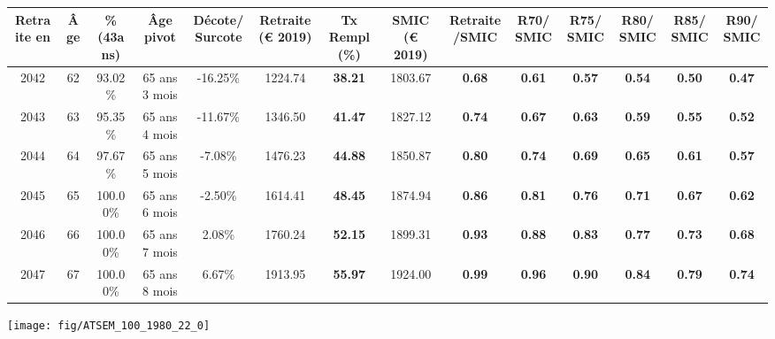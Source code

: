 \begin{adjustbox}{max width=\textwidth} 
\begin{tabular}[htb]{|c|c||c|c|c||c|c||c|c||c|c|c|c|c|} 
\hline 
 Retraite en &  Âge &  \%(43ans) &  Âge pivot &  Décote/Surcote &  Retraite (\euro{} 2019) &  Tx Rempl(\%) &  SMIC (\euro{} 2019) &  Retraite/SMIC &  R70/SMIC &  R75/SMIC &  R80/SMIC &  R85/SMIC &  R90/SMIC \\ 
\hline \hline 
 2042 &  62 &  93.02\% &  65 ans 3 mois &  -16.25\% &  1224.74 &  {\bf 38.21} &  1803.67 &  {\bf {\color{red} 0.68}} &  {\bf {\color{red} 0.61}} &  {\bf {\color{red} 0.57}} &  {\bf {\color{red} 0.54}} &  {\bf {\color{red} 0.50}} &  {\bf {\color{red} 0.47}} \\ 
\hline 
 2043 &  63 &  95.35\% &  65 ans 4 mois &  -11.67\% &  1346.50 &  {\bf 41.47} &  1827.12 &  {\bf {\color{red} 0.74}} &  {\bf {\color{red} 0.67}} &  {\bf {\color{red} 0.63}} &  {\bf {\color{red} 0.59}} &  {\bf {\color{red} 0.55}} &  {\bf {\color{red} 0.52}} \\ 
\hline 
 2044 &  64 &  97.67\% &  65 ans 5 mois &  -7.08\% &  1476.23 &  {\bf 44.88} &  1850.87 &  {\bf {\color{red} 0.80}} &  {\bf {\color{red} 0.74}} &  {\bf {\color{red} 0.69}} &  {\bf {\color{red} 0.65}} &  {\bf {\color{red} 0.61}} &  {\bf {\color{red} 0.57}} \\ 
\hline 
 2045 &  65 &  100.00\% &  65 ans 6 mois &  -2.50\% &  1614.41 &  {\bf 48.45} &  1874.94 &  {\bf {\color{red} 0.86}} &  {\bf {\color{red} 0.81}} &  {\bf {\color{red} 0.76}} &  {\bf {\color{red} 0.71}} &  {\bf {\color{red} 0.67}} &  {\bf {\color{red} 0.62}} \\ 
\hline 
 2046 &  66 &  100.00\% &  65 ans 7 mois &  2.08\% &  1760.24 &  {\bf 52.15} &  1899.31 &  {\bf {\color{red} 0.93}} &  {\bf {\color{red} 0.88}} &  {\bf {\color{red} 0.83}} &  {\bf {\color{red} 0.77}} &  {\bf {\color{red} 0.73}} &  {\bf {\color{red} 0.68}} \\ 
\hline 
 2047 &  67 &  100.00\% &  65 ans 8 mois &  6.67\% &  1913.95 &  {\bf 55.97} &  1924.00 &  {\bf {\color{red} 0.99}} &  {\bf {\color{red} 0.96}} &  {\bf {\color{red} 0.90}} &  {\bf {\color{red} 0.84}} &  {\bf {\color{red} 0.79}} &  {\bf {\color{red} 0.74}} \\ 
\hline 
\hline 
\end{tabular} 
\end{adjustbox} 
 
 \vspace{0.1cm} 

 {\hspace{-2.2cm}\texttt{[image: fig/ATSEM\_100\_1980\_22\_0]}} 

